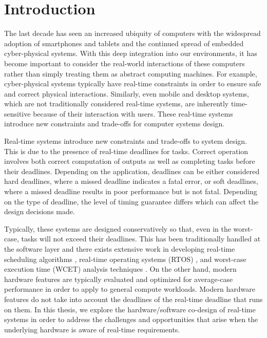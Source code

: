 \chapter{Introduction}
\label{chap:intro}

The last decade has seen an increased ubiquity of computers with the widespread
adoption of smartphones and tablets and the continued spread of embedded
cyber-physical systems. With this deep integration into our environments, it has
become important to consider the real-world interactions of these computers
rather than simply treating them as abstract computing machines. For example,
cyber-physical systems typically have real-time constraints in order to ensure
safe and correct physical interactions. Similarly, even mobile and desktop
systems, which are not traditionally considered real-time systems, are
inherently time-sensitive because of their interaction with users.
These real-time systems introduce new constraints and trade-offs for computer
systems design.

Real-time systems introduce new constraints and trade-offs to system design.
This is due to the presence of real-time deadlines for tasks.
Correct operation involves both correct computation of outputs as well as
completing tasks before their deadlines. Depending on the application,
deadlines can be either considered hard deadlines, where a missed deadline
indicates a fatal error, or soft deadlines, where a missed deadline results in
poor performance but is not fatal. Depending on the type of deadline, the level
of timing guarantee differs which can affect the design decisions made.

Typically, these systems are designed conservatively so that, even in the
worst-case, tasks will not exceed their deadlines.  This has been traditionally
handled at the software layer and there exists extensive work in developing real-time scheduling
algorithms \cite{rtschedulingsurvey-csur11}, real-time operating systems (RTOS)
\cite{rtossurvey-micro09, rtossurvey-icesc14}, and worst-case execution time
(WCET) analysis techniques \cite{wcetsurvey-tecs08}. On the other hand, modern hardware
features are typically evaluated and optimized for average-case performance in
order to apply to general compute workloads. Modern hardware features do not
take into account the deadlines of the real-time deadline that runs on them.
In this thesis, we explore the hardware/software co-design of real-time systems
in order to address the challenges and opportunities that
arise when the underlying hardware is aware of real-time requirements.

